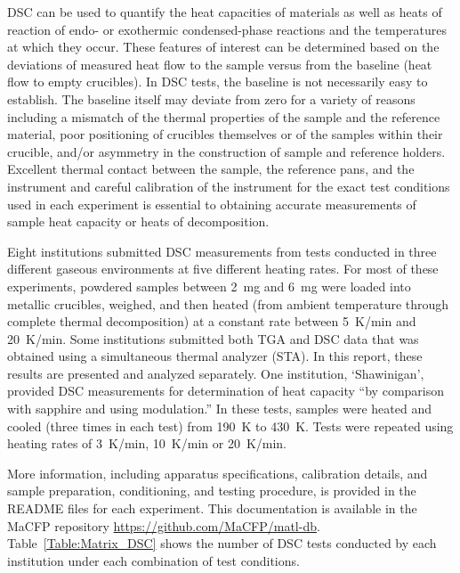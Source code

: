 \documentclass{book}
\begin{document}
DSC can be used to quantify the heat capacities of materials as well as heats of reaction of endo- or exothermic condensed-phase reactions and the temperatures at which they occur. These features of interest can be determined based on the deviations of measured heat flow to the sample versus from the baseline (heat flow to empty crucibles). In DSC tests, the baseline is not necessarily easy to establish. The baseline itself may deviate from zero for a variety of reasons including a mismatch of the thermal properties of the sample and the reference material, poor positioning of crucibles themselves or of the samples within their crucible, and/or asymmetry in the construction of sample and reference holders. Excellent thermal contact between the sample, the reference pans, and the instrument and careful calibration of the instrument for the exact test conditions used in each experiment is essential to obtaining accurate measurements of sample heat capacity or heats of decomposition.

Eight institutions submitted DSC measurements from tests conducted in three different gaseous environments at five different heating rates. For most of these experiments, powdered samples between 2~mg and 6~mg were loaded into metallic crucibles, weighed, and then heated (from ambient temperature through complete thermal decomposition) at a constant rate between 5~K/min and 20~K/min. Some institutions submitted both TGA and DSC data that was obtained using a simultaneous thermal analyzer (STA). In this report, these results are presented and analyzed separately. One institution, ‘Shawinigan’, provided DSC measurements for determination of heat capacity ``by comparison with sapphire and using modulation.'' In these tests, samples were heated and cooled (three times in each test) from 190~K to 430~K. Tests were repeated using heating rates of 3~K/min, 10~K/min or 20~K/min.

More information, including  apparatus specifications, calibration details, and sample preparation, conditioning, and testing procedure, is provided in the README files for each experiment. This documentation is available in the MaCFP repository \href{https://github.com/MaCFP/matl-db}{https://github.com/MaCFP/matl-db}. Table~\ref{Table:Matrix_DSC} shows the number of DSC tests conducted by each institution under each combination of test conditions.
\end{document}
